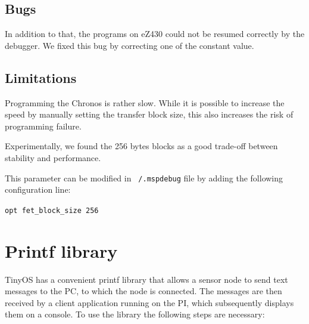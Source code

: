 \subsection{Bugs}
\label{ch:mspd_bugs}
In addition to that, the programs on eZ430 could not be resumed correctly by the debugger.
We fixed this bug by correcting one of the constant value.

\subsection{Limitations}
\label{ch:mspd_limitations}

Programming the Chronos is rather slow. While it is possible to increase the speed by manually setting the transfer block size, this also increases the risk of programming failure.

Experimentally, we found the 256 bytes blocks as a good trade-off between stability and performance.

This parameter can be modified in \texttt{~/.mspdebug} file by adding the following configuration line:

\texttt{opt fet\_block\_size 256}


\section{Printf library}
\label{sec:printf_library}

TinyOS has a convenient printf library that allows a sensor node to send text messages to the PC, to which the node is connected. The messages are then received by a client application running on the PI, which subsequently displays them on a console. To use the library the following steps are necessary:

